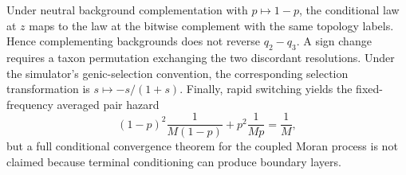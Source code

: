 \documentclass[11pt]{article}
\begin{document}
Under neutral background complementation with \(p\mapsto1-p\), the conditional
law at \(z\) maps to the law at the bitwise complement with the same topology
labels. Hence complementing backgrounds does not reverse \(q_2-q_3\). A sign
change requires a taxon permutation exchanging the two discordant resolutions.
Under the simulator's genic-selection convention, the corresponding selection
transformation is \(s\mapsto-s/(1+s)\). Finally, rapid switching yields the
fixed-frequency averaged pair hazard
\[
(1-p)^2\frac{1}{M(1-p)}+p^2\frac{1}{Mp}=\frac1M,
\]
but a full conditional convergence theorem for the coupled Moran process is
not claimed because terminal conditioning can produce boundary layers.
\end{document}

